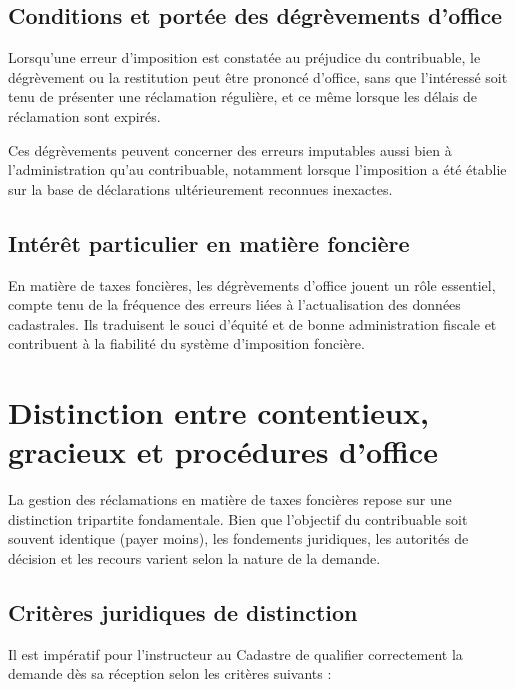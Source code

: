 \documentclass[Cours_contentieuxTF2026.tex]{subfiles}
\begin{document}
\subsection{Conditions et portée des dégrèvements d’office}

Lorsqu’une erreur d’imposition est constatée au préjudice du contribuable, le
dégrèvement ou la restitution peut être prononcé d’office, sans que l’intéressé soit
tenu de présenter une réclamation régulière, et ce même lorsque les délais de
réclamation sont expirés.

Ces dégrèvements peuvent concerner des erreurs imputables aussi bien à
l’administration qu’au contribuable, notamment lorsque l’imposition a été établie
sur la base de déclarations ultérieurement reconnues inexactes.

\subsection{Intérêt particulier en matière foncière}

En matière de taxes foncières, les dégrèvements d’office jouent un rôle essentiel,
compte tenu de la fréquence des erreurs liées à l’actualisation des données
cadastrales. Ils traduisent le souci d’équité et de bonne administration fiscale et
contribuent à la fiabilité du système d’imposition foncière.


\section{Distinction entre contentieux, gracieux et procédures d’office}

La gestion des réclamations en matière de taxes foncières repose sur une distinction tripartite fondamentale. Bien que l'objectif du contribuable soit souvent identique (payer moins), les fondements juridiques, les autorités de décision et les recours varient selon la nature de la demande.

\subsection{Critères juridiques de distinction}

Il est impératif pour l'instructeur au Cadastre de qualifier correctement la demande dès sa réception selon les critères suivants :
\end{document}
